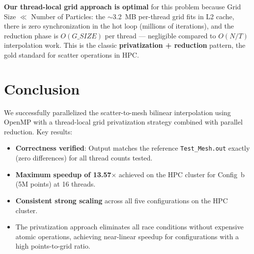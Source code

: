 \documentclass[12pt,a4paper]{article}
\begin{document}
\textbf{Our thread-local grid approach is optimal} for this problem because Grid Size $\ll$ Number of Particles: the $\sim$3.2~MB per-thread grid fits in L2 cache, there is zero synchronization in the hot loop (millions of iterations), and the reduction phase is $O(G\_SIZE)$ per thread --- negligible compared to $O(N/T)$ interpolation work. This is the classic \textbf{privatization + reduction} pattern, the gold standard for scatter operations in HPC.

\section{Conclusion}

We successfully parallelized the scatter-to-mesh bilinear interpolation using OpenMP with a thread-local grid privatization strategy combined with parallel reduction. Key results:

\begin{itemize}
    \item \textbf{Correctness verified}: Output matches the reference \texttt{Test\_Mesh.out} exactly (zero differences) for all thread counts tested.
    \item \textbf{Maximum speedup of 13.57$\times$} achieved on the HPC cluster for Config~b (5M points) at 16 threads.
    \item \textbf{Consistent strong scaling} across all five configurations on the HPC cluster.
    \item The privatization approach eliminates all race conditions without expensive atomic operations, achieving near-linear speedup for configurations with a high points-to-grid ratio.
\end{itemize}



\newpage
{}
\end{document}

